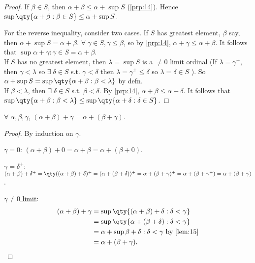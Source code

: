 \begin{proof}
    If $\beta \in S$, then $\alpha + \beta \leq \alpha + \sup S$ (\cref{prp:14}).
    Hence $\sup \qty{\alpha + \beta : \beta \in S} \leq \alpha + \sup S$.

    For the reverse inequality, consider two cases.
    If $S$ has greatest element, $\beta$ say, then $\alpha + \sup S = \alpha + \beta$.
    $\forall \; \gamma \in S, \gamma \leq \beta$, so by \cref{prp:14}, $\alpha + \gamma \leq \alpha + \beta$.
    It follows that $\sup{\alpha + \gamma : \gamma \in S} = \alpha + \beta$. \\
    If $S$ has no greatest element, then $\lambda = \sup S$ is a $\neq 0$ limit ordinal (If $\lambda = \gamma^+$, then $\gamma < \lambda$ so $\exists \; \delta \in S$ s.t. $\gamma < \delta$ then $\lambda = \gamma^+ \leq \delta$ so $\lambda = \delta \in S$ \Lightning).
    So $\alpha + \sup S = \sup \qty{\alpha + \beta : \beta < \lambda}$ by defn. \\
    If $\beta < \lambda$, then $\exists \; \delta \in S$ s.t. $\beta < \delta$.
    By \cref{prp:14}, $\alpha + \beta \leq \alpha + \delta$.
    It follows that $\sup \qty{\alpha + \beta : \beta < \lambda} \leq \sup \qty{\alpha + \delta : \delta \in S}$.
\end{proof}

\begin{proposition} \label{prp:16}
    $\forall \; \alpha, \beta, \gamma$, $(\alpha + \beta) + \gamma = \alpha + (\beta + \gamma)$.
\end{proposition}

\begin{proof}
    By induction on $\gamma$.

    \underline{$\gamma = 0$}: $(\alpha + \beta) + 0 = \alpha + \beta = \alpha + (\beta + 0)$.

    \underline{$\gamma = \delta^+$}: $(\alpha + \beta) + \delta^+ = \qty((\alpha + \beta) + \delta)^+ = (\alpha + (\beta + \delta))^+ = \alpha + (\beta + \gamma)^+ = \alpha + (\beta + \gamma^+) = \alpha + (\beta + \gamma)$.

    \underline{$\gamma \neq 0$ limit}:
    \begin{align*}
        (\alpha + \beta) + \gamma &= \sup \qty{(\alpha + \beta) + \delta : \delta < \gamma} \\
        &= \sup \qty{\alpha + (\beta + \delta) : \delta < \gamma} \\
        &= \alpha + \sup{\beta + \delta : \delta < \gamma} \text{ by \cref{lem:15}} \\
        &= \alpha + (\beta + \gamma).
    \end{align*}
\end{proof}


